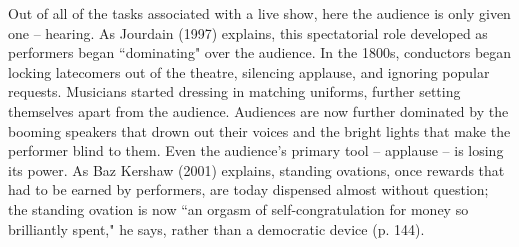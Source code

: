 Out of all of the tasks associated with a live show, here the audience is only given one -- hearing. As Jourdain (1997) explains, this spectatorial role developed as performers began ``dominating" over the audience. In the 1800s, conductors began locking latecomers out of the theatre, silencing applause, and ignoring popular requests. Musicians started dressing in matching uniforms, further setting themselves apart from the audience. Audiences are now further dominated by the booming speakers that drown out their voices and the bright lights that make the performer blind to them. Even the audience's primary tool -- applause -- is losing its power. As Baz Kershaw (2001) explains, standing ovations, once rewards that had to be earned by performers, are today dispensed almost without question; the standing ovation is now ``an orgasm of self-congratulation for money so brilliantly spent," he says, rather than a democratic device (p. 144).

